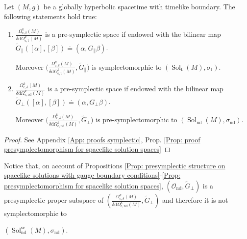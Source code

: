 \begin{proposition}\label{Prop: presymplectomorphism for spacelike solution spaces}
	Let $(M,g)$ be a globally hyperbolic spacetime with timelike boundary.
	The following statements hold true:
	\begin{enumerate}
		\item
		$\frac{\Omega^k_{\mathrm{c},\delta}(M)}{\delta\mathrm{d}\Omega_{\mathrm{c},\mathrm{t}}^k(M)}$ is a pre-symplectic space if endowed with the bilinear map $\widetilde{G}_\parallel([\alpha],[\beta])\doteq(\alpha,G_\parallel\beta)$.
		
		Moreover $\bigg(\frac{\Omega^k_{\mathrm{c},\delta}(M)}{\delta\mathrm{d}\Omega_{\mathrm{c},\mathrm{t}}^k(M)},\widetilde{G}_\parallel\bigg)$ is symplectomorphic to $(\operatorname{Sol}_{\mathrm{t}}(M),\sigma_{\mathrm{t}})$.
		\item
		$\frac{\Omega^k_{\mathrm{c},\delta}(M)}{\delta\mathrm{d}\Omega_{\mathrm{c,nd}}^k(M)}$ is a pre-symplectic space
		if endowed with the bilinear map $\widetilde{G}_\perp([\alpha],[\beta])\doteq(\alpha,G_\perp\beta)$.
		
		Moreover $\bigg(\frac{\Omega^k_{\mathrm{c},\delta}(M)}{\delta\mathrm{d}\Omega_{\mathrm{c},\mathrm{nd}}^k(M)},\widetilde{G}_\perp\bigg)$ is pre-symplectomorphic to $(\operatorname{Sol}_{\mathrm{nd}}(M),\sigma_{\mathrm{nd}})$.
	\end{enumerate}  
\end{proposition}
\begin{proof}
	See Appendix \ref{App: proofs symplectic}, Prop. \ref{Prop: proof presymplectomorphism for spacelike solution spaces}
\end{proof}
\begin{remark}\label{Rmk: bc for obs associated to deltad-normal bc}
	Notice that, on account of Propositions \ref{Prop: presymplectic structure on spacelike solutions with gauge boundary conditions}-\ref{Prop: presymplectomorphism for spacelike solution spaces}, $(\mathcal{O}_{\mathrm{nd}},\widetilde{G}_\perp)$ is a presymplectic proper subspace of $\left(\frac{\Omega_{\mathrm{c},\delta}^k(M)}{\delta\mathrm{d}\Omega_{\mathrm{c},\mathrm{nd}}^k(M)},\widetilde{G}_\perp\right)$ and therefore it is not symplectomorphic to
	
	$(\operatorname{Sol}_{\mathrm{nd}}^{\mathrm{sc}}(M),\sigma_{\mathrm{nd}})$.
\end{remark}




